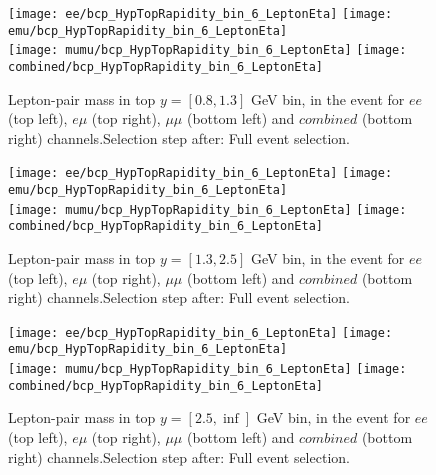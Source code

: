 \clearpage
\newpage
\begin{figure}
  \texttt{[image: ee/bcp\_HypTopRapidity\_bin\_6\_LeptonEta]}
  \texttt{[image: emu/bcp\_HypTopRapidity\_bin\_6\_LeptonEta]}\\
  \texttt{[image: mumu/bcp\_HypTopRapidity\_bin\_6\_LeptonEta]}
  \texttt{[image: combined/bcp\_HypTopRapidity\_bin\_6\_LeptonEta]}
\caption{Lepton-pair mass in top $y = [0.8,1.3]$ GeV bin, in the event for $ee$ (top left), $e\mu$ (top right), $\mu\mu$ (bottom left) and $combined$ (bottom right) channels.\newline Selection step after: Full event selection.}
\end{figure}

\clearpage
\newpage
\begin{figure}
  \texttt{[image: ee/bcp\_HypTopRapidity\_bin\_6\_LeptonEta]}
  \texttt{[image: emu/bcp\_HypTopRapidity\_bin\_6\_LeptonEta]}\\
  \texttt{[image: mumu/bcp\_HypTopRapidity\_bin\_6\_LeptonEta]}
  \texttt{[image: combined/bcp\_HypTopRapidity\_bin\_6\_LeptonEta]}
\caption{Lepton-pair mass in top $y = [1.3,2.5]$ GeV bin, in the event for $ee$ (top left), $e\mu$ (top right), $\mu\mu$ (bottom left) and $combined$ (bottom right) channels.\newline Selection step after: Full event selection.}
\end{figure}

\clearpage
\newpage
\begin{figure}
  \texttt{[image: ee/bcp\_HypTopRapidity\_bin\_6\_LeptonEta]}
  \texttt{[image: emu/bcp\_HypTopRapidity\_bin\_6\_LeptonEta]}\\
  \texttt{[image: mumu/bcp\_HypTopRapidity\_bin\_6\_LeptonEta]}
  \texttt{[image: combined/bcp\_HypTopRapidity\_bin\_6\_LeptonEta]}
\caption{Lepton-pair mass in top $y = [2.5,\inf]$ GeV bin, in the event for $ee$ (top left), $e\mu$ (top right), $\mu\mu$ (bottom left) and $combined$ (bottom right) channels.\newline Selection step after: Full event selection.}
\end{figure}

\clearpage
\newpage






